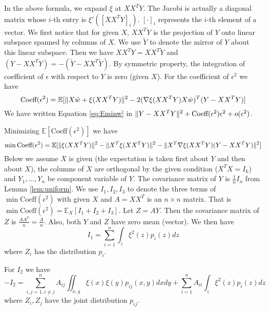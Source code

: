 \documentclass{article}
\DeclarePairedDelimiter\norm{\lVert}{\rVert}
\def\E{\mathbb{E}}
\begin{document}
In the above formula,  we expand $\xi$ at $XX^TY$. The Jacobi is actually a diagonal matrix whose $i$-th entry is $\xi'([XX^TY]_i)$. $[\cdot]_i$ represents the $i$-th element of a vector.
We first notice that for given $X$, $XX^TY$ is the projection of $Y$ onto linear subspace spanned by columns of $X$. We use $\tilde{Y}$ to denote the mirror of $Y$ about this linear subspace. Then we have
$XX^T Y = XX^T \tilde{Y}$ and $(Y- XX^TY) = -(\tilde{Y} - XX^T \tilde{Y})$. By symmetric property, the integration of coefficient of $\epsilon$ with respect to $Y$ is zero (given $X$). For the coefficient of $\epsilon^2$ we have
\begin{equation*}
\textrm{Coeff}(\epsilon^2)  =  \E[\norm{X\hat{w} + \xi(XX^TY)}^2 - 2 (\nabla \xi(XX^TY)X\hat{w})^T(Y-XX^TY)]
\end{equation*}
We have written Equation \eqref{eq:Eminw} in $ \norm{Y - X X^T Y}^2 + \textrm{Coeff}(\epsilon^2) \epsilon^2 + o(\epsilon^2)$.

Minimizing $\E[\textrm{Coeff}(\epsilon^2)]$ we have
\begin{equation}
\min \textrm{Coeff}(\epsilon^2) = \E[\norm{\xi(XX^TY)}^2 - \norm{X^T\xi(XX^TY)}^2 - \norm{X^T \nabla\xi(XX^TY)(Y-XX^TY)}^2]
\end{equation}
Below we assume $X$ is given (the expectation is taken first about $Y$ and then about $X$), the columns of $X$ are orthogonal by the given condition ($X^TX=I_k$) and $Y_1, \dots, Y_n $ be component variable of $Y$. The covariance matrix of $Y$ is $\frac{1}{n}I_n$ from Lemma \ref{lem:uniform}. We use $I_1, I_2, I_3$ to denote the three terms of $\min \textrm{Coeff}(\epsilon^2)$ with given $X$ and $A=XX^T$ is an $n\times n$ matrix. That is $ \min \textrm{Coeff}(\epsilon^2) = \E_{X} [I_1 + I_2 + I_3]$.
Let $Z = AY$. Then the covariance matrix of $Z$ is $\frac{AA^T}{n} = \frac{A}{n}$.
Also, both $Y$ and $Z$ have zero mean (vector). We then have
\begin{equation*}
I_1 = \sum_{i=1}^n \int_z \xi^2(z) p_i(z) dz
\end{equation*}
where $Z_i$ has the distribution $p_i$.
 
For $I_2$
we have
\begin{equation*}
-I_2   = \sum_{i,j=1, i \neq j}^n A_{ij} \iint_{x,y} \xi(x)\xi(y) p_{ij}(x,y) dx dy + \sum_{i=1}^n A_{ii} \int_z \xi^2(z) p_i(z) dz 
\end{equation*}
where $Z_i, Z_j$ have the joint distribution $p_{ij}$.
\end{document}
